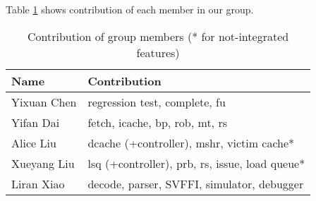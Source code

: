 Table \ref{tab:contrib} shows contribution of each member in our group.

\begin{table}[htbp]
\centering
\begin{tabular}{l|l}
Name        & Contribution                                              \\
\hline
Yixuan Chen & regression test, complete, fu                             \\
Yifan Dai   & fetch, icache, bp, rob, mt, rs                        \\
Alice Liu   & dcache (+controller), mshr, victim cache*                 \\
Xueyang Liu & lsq (+controller), prb, rs, issue, load queue*           \\
Liran Xiao  & decode, parser, SVFFI, simulator, debugger
\end{tabular}
\caption{Contribution of group members (* for not-integrated features)}
\label{tab:contrib}
\end{table}
